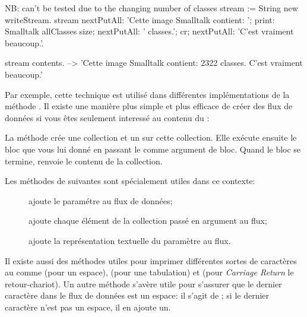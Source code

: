 \documentclass[a4paper,10pt,twoside]{book}
\begin{document}
\begin{code}{NB: can't be tested due to the changing number of classes}
stream := String new writeStream.
stream
  nextPutAll: 'Cette image Smalltalk contient: ';
  print: Smalltalk allClasses size;
  nextPutAll: ' classes.';
  cr;
  nextPutAll: 'C'est vraiment beaucoup.'.

stream contents. --> 'Cette image Smalltalk contient: 2322 classes.
C'est vraiment beaucoup.'
\end{code}

Par exemple, cette technique est utilis\'e dans diff\'erentes 
impl\'ementations de la m\'ethode . Il existe une mani\`ere
plus simple et plus efficace de cr\'eer des flux de donn\'ees si vous \^etes
seulement interess\'e au contenu du \stream:


La m\'ethode  \label{sec:streamContents} cr\'ee une collection et un \stream sur cette collection.
Elle ex\'ecute ensuite le bloc que vous lui donn\'e en passant le \stream comme argument de bloc. Quand le bloc se termine, 
renvoie le contenu de la collection.

Les m\'ethodes de  suivantes sont sp\'ecialement utiles dans ce contexte:

\begin{description}
\item[] ajoute le param\'etre au flux de donn\'ees;
\item[] ajoute chaque \'el\'ement de la collection pass\'e en argument au flux;
\item[] ajoute la repr\'esentation textuelle du param\`etre au flux.
\end{description}

Il existe aussi des m\'ethodes utiles pour imprimer diff\'erentes sortes
de caract\`eres au \stream comme  (pour un espace), 
    (pour une tabulation) et
 (pour \emph{Carriage Return} \cad le retour-chariot).
Un autre m\'ethode s'av\`ere utile pour s'assurer que le dernier caract\`ere
dans le flux de donn\'ees est un espace: il s'agit de ; si le dernier caract\`ere n'est pas un espace, il en ajoute un.
\end{document}
